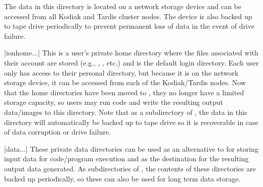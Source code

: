 \begin{tcbenvironment}
\begin{tcbparbox}
The data in this directory is located on a network storage device and can be accessed from all Kodiak and Tardis cluster nodes.  The device is also backed up to    tape drive periodically to prevent permanent loss of data in the event of drive failure.
\end{tcbparbox}
\begin{tcbparbox}|\dirsep ion\dirsep home\dirsep{}\dirsep$\dots$|
\bfdash This is a user's private home directory where the files associated with their account are stored (e.g., , , etc.) and is the default login directory.  Each user only has access to their personal directory, but because it is on the network storage device, it can be accessed from each of the Kodiak/Tardis nodes. Now that the home directories have been moved to , they no longer have a limited storage capacity, so users may run code and write the resulting output data/images to this directory.  Note that as a subdirectory of , the data in this directory will automatically be backed up to tape drive so it is recoverable in case of data corruption or drive failure.
\end{tcbparbox}
\begin{tcbparbox}|\dirsep data\dirsep{}\dirsep$\dots$|
\bfdash These private data directories can be used as an alternative to  for storing input data for code/program execution and as the destination for the resulting output data generated.  As subdirectories of , the contents of these directories are backed up periodically, so these can also be used for long term data storage.

\end{tcbparbox}
\end{tcbenvironment}
